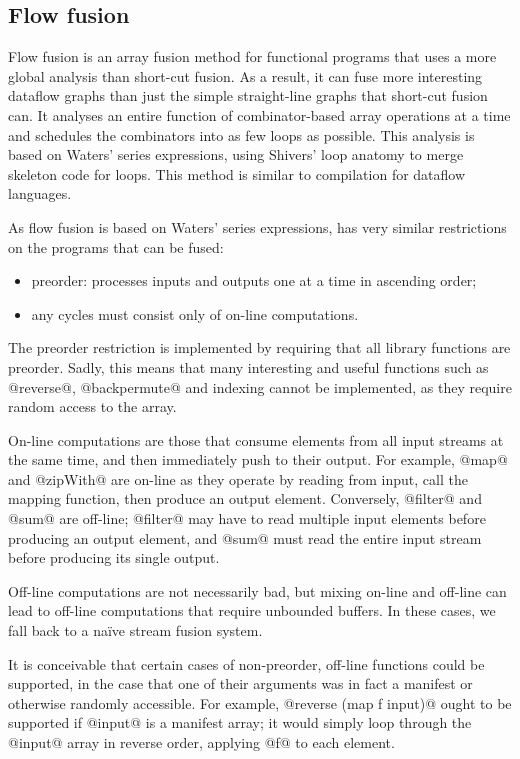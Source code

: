 \documentclass[12pt,a4paper]{article}
\begin{document}
\subsection{Flow fusion}

Flow fusion\cite{lippmeier2013flow} is an array fusion method for functional programs
that uses a more global analysis than short-cut fusion.
As a result, it can fuse more interesting dataflow graphs than just the simple straight-line graphs that short-cut fusion can.
It analyses an entire function of combinator-based array operations at a time and schedules the combinators into as few loops as possible.
This analysis is based on Waters' series expressions\cite{waters1991automatic}, using Shivers' loop anatomy\cite{shivers2005anatomy} to merge skeleton code for loops.
This method is similar to compilation for dataflow languages\cite{johnston2004advances}.

As flow fusion is based on Waters' series expressions\cite{waters1991automatic},
has very similar restrictions on the programs that can be fused:
\begin{itemize}
\item preorder: processes inputs and outputs one at a time in ascending order;
\item any cycles must consist only of on-line computations.
\end{itemize}

The preorder restriction is implemented by requiring that all library functions are preorder.
Sadly, this means that many interesting and useful functions
such as @reverse@, @backpermute@ and indexing cannot be implemented,
as they require random access to the array.

On-line computations are those that consume elements from all input streams at the same time,
and then immediately push to their output. 
For example, @map@ and @zipWith@ are on-line as they operate by reading from input, call the mapping function, then produce an output element.
Conversely, @filter@ and @sum@ are off-line;
@filter@ may have to read multiple input elements before producing an output element,
and @sum@ must read the entire input stream before producing its single output.

Off-line computations are not necessarily bad, but mixing on-line and off-line can lead to off-line computations that require unbounded buffers.
In these cases, we fall back to a na\"{i}ve stream fusion system.


It is conceivable that certain cases of non-preorder, off-line functions could be supported,
in the case that one of their arguments was in fact a manifest or otherwise randomly accessible.
For example, @reverse (map f input)@ ought to be supported if @input@ is a manifest array;
it would simply loop through the @input@ array in reverse order, applying @f@ to each element.
\end{document}
